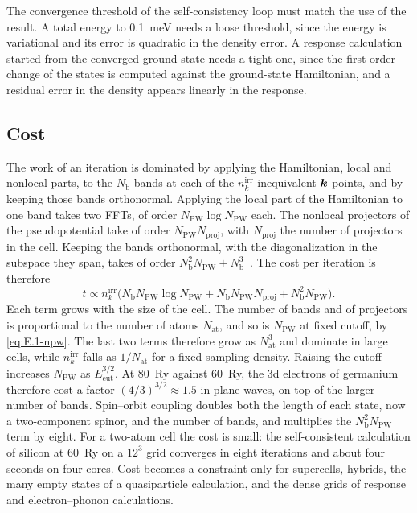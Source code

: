 The convergence threshold of the self-consistency loop must match the use of the result. A total energy to \SI{0.1}{meV} needs a loose threshold, since the energy is variational and its error is quadratic in the density error. A response calculation started from the converged ground state needs a tight one, since the first-order change of the states is computed against the ground-state Hamiltonian, and a residual error in the density appears linearly in the response.

\subsection{Cost}

The work of an iteration is dominated by applying the Hamiltonian, local and nonlocal parts, to the $N_{\mathrm{b}}$ bands at each of the $n_k^{\mathrm{irr}}$ inequivalent $\bm{k}$ points, and by keeping those bands orthonormal. Applying the local part of the Hamiltonian to one band takes two FFTs, of order $N_{\mathrm{PW}}\log N_{\mathrm{PW}}$ each. The nonlocal projectors of the pseudopotential take of order $N_{\mathrm{PW}}N_{\mathrm{proj}}$, with $N_{\mathrm{proj}}$ the number of projectors in the cell. Keeping the bands orthonormal, with the diagonalization in the subspace they span, takes of order $N_{\mathrm{b}}^2N_{\mathrm{PW}} + N_{\mathrm{b}}^3$~\cite{payne1992iterative}. The cost per iteration is therefore
\begin{equation}
  t \propto n_k^{\mathrm{irr}}\bigl(N_{\mathrm{b}}N_{\mathrm{PW}}\log N_{\mathrm{PW}} + N_{\mathrm{b}}N_{\mathrm{PW}}N_{\mathrm{proj}} + N_{\mathrm{b}}^2N_{\mathrm{PW}}\bigr) .
  \label{eq:E.1-cost}
\end{equation}
Each term grows with the size of the cell. The number of bands and of projectors is proportional to the number of atoms $N_{\mathrm{at}}$, and so is $N_{\mathrm{PW}}$ at fixed cutoff, by \cref{eq:E.1-npw}. The last two terms therefore grow as $N_{\mathrm{at}}^3$ and dominate in large cells, while $n_k^{\mathrm{irr}}$ falls as $1/N_{\mathrm{at}}$ for a fixed sampling density. Raising the cutoff increases $N_{\mathrm{PW}}$ as $E_{\mathrm{cut}}^{3/2}$. At \SI{80}{Ry} against \SI{60}{Ry}, the 3d electrons of germanium therefore cost a factor $(4/3)^{3/2} \approx 1.5$ in plane waves, on top of the larger number of bands. Spin--orbit coupling doubles both the length of each state, now a two-component spinor, and the number of bands, and multiplies the $N_{\mathrm{b}}^2N_{\mathrm{PW}}$ term by eight. For a two-atom cell the cost is small: the self-consistent calculation of silicon at \SI{60}{Ry} on a $12^3$ grid converges in eight iterations and about four seconds on four cores. Cost becomes a constraint only for supercells, hybrids, the many empty states of a quasiparticle calculation, and the dense grids of response and electron--phonon calculations.

